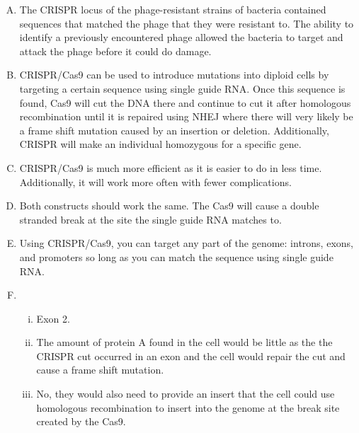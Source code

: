 \documentclass{article}
\begin{document}
\begin{enumerate}[A.]
    \item The CRISPR locus of the phage-resistant strains of bacteria contained sequences that matched the phage that they were resistant to. The ability to identify a previously encountered phage allowed the bacteria to target and attack the phage before it could do damage.
    
    \item CRISPR/Cas9 can be used to introduce mutations into diploid cells by targeting a certain sequence using single guide RNA. Once this sequence is found, Cas9 will cut the DNA there and continue to cut it after homologous recombination until it is repaired using NHEJ where there will very likely be a frame shift mutation caused by an insertion or deletion. Additionally, CRISPR will make an individual homozygous for a specific gene.
    
    \item CRISPR/Cas9 is much more efficient as it is easier to do in less time. Additionally, it will work more often with fewer complications.
    
    \item Both constructs should work the same. The Cas9 will cause a double stranded break at the site the single guide RNA matches to.
    
    \item Using CRISPR/Cas9, you can target any part of the genome: introns, exons, and promoters so long as you can match the sequence using single guide RNA.
    
    \item 
        \begin{enumerate}[i.]
            \item Exon 2.
            
            \item The amount of protein A found in the cell would be little as the the CRISPR cut occurred in an exon and the cell would repair the cut and cause a frame shift mutation.
            
            \item No, they would also need to provide an insert that the cell could use homologous recombination to insert into the genome at the break site created by the Cas9.
        \end{enumerate}
\end{enumerate}
\end{document}
